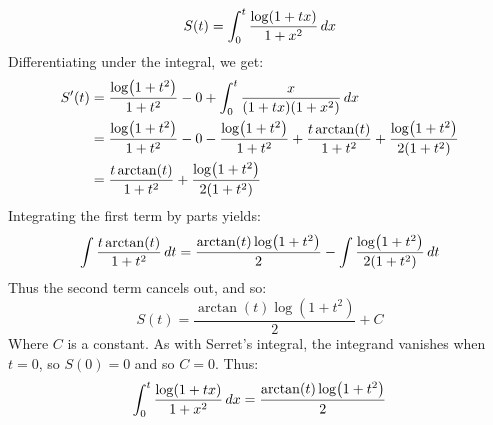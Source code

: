 \documentclass[main.tex]{subfiles}
\begin{document}
\begin{example}
    \begin{equation*}
        S(t) = \int_0^t \frac{\log(1+tx)}{1+x^2}\,dx
    \end{equation*}
    Differentiating under the integral, we get:
    \begin{align*}
        S'(t)
        &= \frac{\log(1+t^2)}{1+t^2} - 0 + \int_0^t \frac{x}{(1+tx)(1+x^2)}\,dx \\
        &= \frac{\log(1+t^2)}{1+t^2} - 0 - \frac{\log(1+t^2)}{1+t^2} + \frac{t\arctan(t)}{1+t^2} + \frac{\log(1+t^2)}{2(1+t^2)} \\
        &= \frac{t\arctan(t)}{1+t^2} + \frac{\log(1+t^2)}{2(1+t^2)}
    \end{align*}
    Integrating the first term by parts yields:
    \begin{equation*}
        \int \frac{t\arctan(t)}{1+t^2}\,dt
        = \frac{\arctan(t)\log(1+t^2)}{2} - \int \frac{\log(1+t^2)}{2(1+t^2)}\,dt
    \end{equation*}
    Thus the second term cancels out, and so:
    \begin{equation*}
        S(t)
        = \frac{\arctan(t)\log(1+t^2)}{2} + C
    \end{equation*}
    Where $C$ is a constant. As with Serret's integral, the integrand vanishes when $t=0$, so $S(0)=0$ and so $C=0$. Thus:
    \begin{equation*}
        \int_0^t \frac{\log(1+tx)}{1+x^2}\,dx
        = \frac{\arctan(t)\log(1+t^2)}{2}
    \end{equation*}
\end{example}
\end{document}
